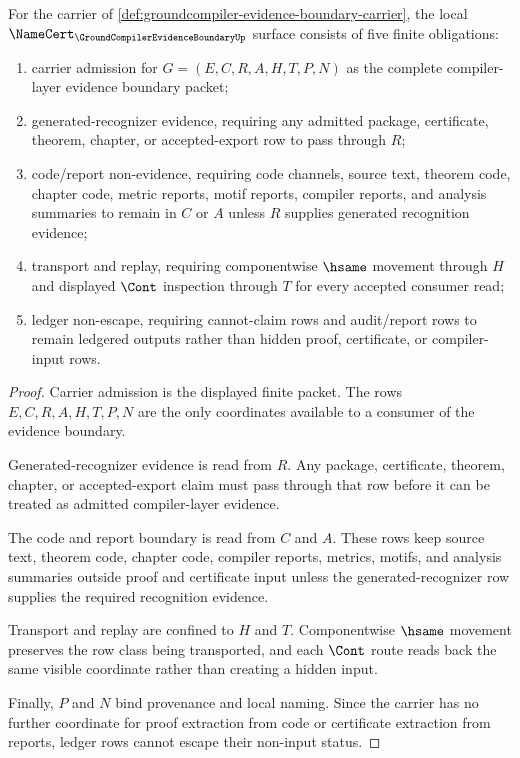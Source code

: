 \begin{theorem}
\label{thm:groundcompiler-evidence-boundary-namecert-obligations}
For the carrier of \autoref{def:groundcompiler-evidence-boundary-carrier}, the local $\NameCert_{\GroundCompilerEvidenceBoundaryUp}$ surface consists of five finite obligations:
\begin{enumerate}
\item carrier admission for $G=(E,C,R,A,H,T,P,N)$ as the complete compiler-layer evidence boundary packet;
\item generated-recognizer evidence, requiring any admitted package, certificate, theorem, chapter, or accepted-export row to pass through $R$;
\item code/report non-evidence, requiring code channels, source text, theorem code, chapter code, metric reports, motif reports, compiler reports, and analysis summaries to remain in $C$ or $A$ unless $R$ supplies generated recognition evidence;
\item transport and replay, requiring componentwise $\hsame$ movement through $H$ and displayed $\Cont$ inspection through $T$ for every accepted consumer read;
\item ledger non-escape, requiring cannot-claim rows and audit/report rows to remain ledgered outputs rather than hidden proof, certificate, or compiler-input rows.
\end{enumerate}
\end{theorem}
\begin{proof}
Carrier admission is the displayed finite packet. The rows $E,C,R,A,H,T,P,N$ are the only coordinates available to a consumer of the evidence boundary.

Generated-recognizer evidence is read from $R$. Any package, certificate, theorem, chapter, or accepted-export claim must pass through that row before it can be treated as admitted compiler-layer evidence.

The code and report boundary is read from $C$ and $A$. These rows keep source text, theorem code, chapter code, compiler reports, metrics, motifs, and analysis summaries outside proof and certificate input unless the generated-recognizer row supplies the required recognition evidence.

Transport and replay are confined to $H$ and $T$. Componentwise $\hsame$ movement preserves the row class being transported, and each $\Cont$ route reads back the same visible coordinate rather than creating a hidden input.

Finally, $P$ and $N$ bind provenance and local naming. Since the carrier has no further coordinate for proof extraction from code or certificate extraction from reports, ledger rows cannot escape their non-input status.
\end{proof}

